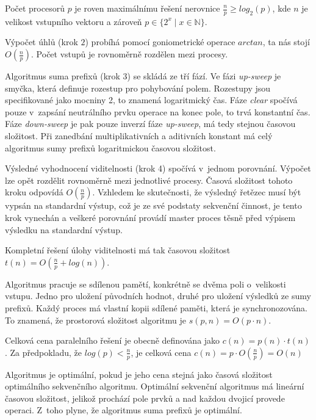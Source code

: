 \documentclass[11pt, a4paper, titlepage]{article}
\begin{document}
Počet procesorů $p$ je roven maximálnímu řešení
nerovnice $\frac{n}{p} \ge log_{2}(p)$, kde $n$ je velikost
vstupního vektoru a zároveň $p \in \{2^x \mid x \in \mathbb{N}\}$.

Výpočet úhlů (krok $2$) probíhá pomocí goniometrické operace
$arctan$, ta nás stojí $O(\frac{n}{p})$.
Počet vstupů je rovnoměrně rozdělen mezi procesy.

Algoritmus suma prefixů (krok 3) se skládá ze tří fází.
Ve fázi \textit{up-sweep} je smyčka, která definuje
rozestup pro pohybování polem. Rozestupy jsou specifikované jako
mocniny 2, to znamená logaritmický čas.
Fáze \textit{clear} spočívá pouze v~zapsání neutrálního
prvku operace na konec pole, to trvá konstantní čas.
Fáze \textit{down-sweep} je pak pouze inverzí fáze
\textit{up-sweep}, má tedy stejnou časovou složitost.
Při zanedbání multiplikativních a aditivních konstant má
celý algoritmus sumy prefixů logaritmickou časovou složitost.

Výsledné vyhodnocení viditelnosti (krok 4) spočívá v~jednom porovnání.
Výpočet lze opět rozdělit rovnoměrně mezi jednotlivé procesy.
Časová složitost tohoto kroku odpovídá $O(\frac{n}{p})$.
Vzhledem ke skutečnosti, že výsledný řetězec musí být vypsán
na standardní výstup, což je ze své podstaty sekvenční činnost,
je tento krok vynechán a veškeré porovnání provádí master proces
těsně před výpisem výsledku na standardní výstup.

Kompletní řešení úlohy viditelnosti má tak časovou složitost
$t(n) = O(\frac{n}{p} + log(n))$.

Algoritmus pracuje se sdílenou pamětí, konkrétně se dvěma
poli o~velikosti vstupu.
Jedno pro uložení původních hodnot, druhé pro uložení výsledků
ze sumy prefixů.
Každý proces má vlastní kopii sdílené paměti,
která je synchronozována.
To znamená, že prostorová složitost algoritmu je
$s(p, n) = O(p \cdot n)$.

Celková cena paralelního řešení je obecně definována jako
$c(n) = p(n) \cdot t(n)$.
Za předpokladu, že $log(p) < \frac{n}{p}$,
je celková cena $c(n) = p \cdot O(\frac{n}{p}) = O(n)$

Algoritmus je optimální, pokud je jeho cena stejná jako časová složitost
optimálního sekvenčního algoritmu.
Optimální sekvenční algoritmus má lineární časovou složitost,
jelikož prochází pole prvků a nad každou dvojicí provede operaci.
Z~toho plyne, že algoritmus suma prefixů je optimální.

\end{document}
